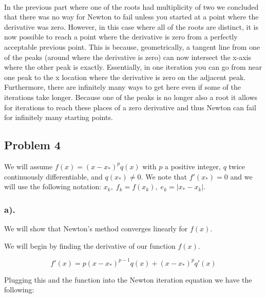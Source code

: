 \documentclass[11pt]{article}
\begin{document}
    \begin{center}
    \end{center}
    { \hspace*{\fill} \\}
    
    In the previous part where one of the roots had multiplicity of two we
concluded that there was no way for Newton to fail unless you started at
a point where the derivative was zero. However, in this case where all
of the roots are distinct, it is now possible to reach a point where the
derivative is zero from a perfectly acceptable previous point. This is
because, geometrically, a tangent line from one of the peaks (around
where the derivative is zero) can now intersect the x-axis where the
other peak is exactly. Essentially, in one iteration you can go from
near one peak to the x location where the derivative is zero on the
adjacent peak. Furthermore, there are infinitely many ways to get here
even if some of the iterations take longer. Because one of the peaks is
no longer also a root it allows for iterations to reach these places of
a zero derivative and thus Newton can fail for infinitely many starting
points.
\newpage
    \hypertarget{problem-4}{%
\subsection*{Problem 4}\label{problem-4}}

We will assume \(f(x)=(x-x_*)^pq(x)\) with \(p\) a positive integer,
\(q\) twice continuously differentiable, and \(q(x_*)\neq0\). We note
that \(f'(x_*)=0\) and we will use the following notation:
\(x_k,\;f_k=f(x_k),\;e_k=|x_*-x_k|\).

    \hypertarget{a.}{%
\subsubsection*{a).}\label{a.}}

We will show that Newton's method converges linearly for \(f(x)\).

    We will begin by finding the derivative of our function \(f(x)\).

\[ f'(x) = p(x-x_*)^{p-1}q(x) + (x-x_*)^pq'(x) \]

Plugging this and the function into the Newton iteration equation we
have the following:
\end{document}
